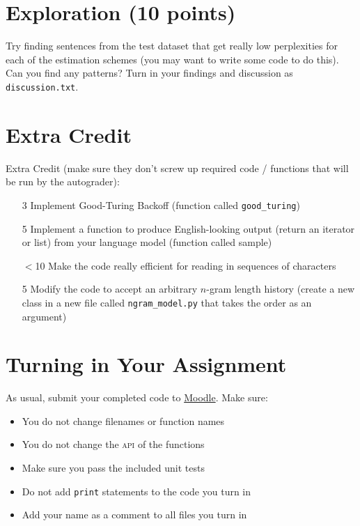 \documentclass[11pt]{article}
\begin{document}
\section{Exploration (10 points)}

Try finding sentences from the test dataset that get really low perplexities for each of the estimation schemes (you may want to write some code to do this).  Can you find any patterns?  Turn in your findings and discussion as \texttt{discussion.txt}.

\section*{Extra Credit}

Extra Credit (make sure they don't screw up required code / functions that will be run by the autograder):
\begin{itemize}
\item[3] Implement Good-Turing Backoff (function called \texttt{good\_turing})
\item[5] Implement a function to produce English-looking output (return an iterator or list) from your language model (function called sample)
\item[$<$10] Make the code really efficient for reading in sequences of characters
\item[5] Modify the code to accept an arbitrary $n$-gram length history (create a new class in a new file called \texttt{ngram\_model.py} that takes the order as an argument)
\end{itemize}


\section*{Turning in Your Assignment}

As usual, submit your completed code to
\href{https://moodle.cs.colorado.edu/course/view.php?id=161}{Moodle}.
Make sure:
\begin{itemize}
  \item You do not change filenames or function names
  \item You do not change the \textsc{api} of the functions
  \item Make sure you pass the included unit tests
  \item Do not add \texttt{print} statements to the code you turn in
  \item Add your name as a comment to all files you turn in
\end{itemize}
\end{document}
